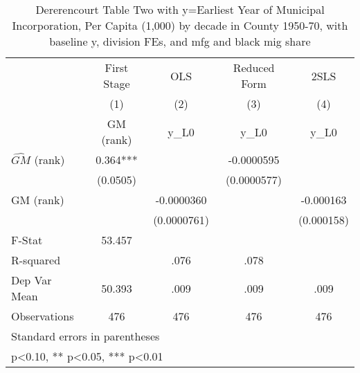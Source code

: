 \begin{table}[htbp]\centering
\def\sym#1{\ifmmode^{#1}\else\(^{#1}\)\fi}
\caption{Dererencourt Table Two with y=Earliest Year of Municipal Incorporation, Per Capita (1,000) by decade in County 1950-70, with baseline y, division FEs, and mfg and black mig share}
\begin{tabular}{l*{4}{c}}
\toprule
                    & First Stage   &         OLS   &Reduced Form   &        2SLS   \\
                    &\multicolumn{1}{c}{(1)}&\multicolumn{1}{c}{(2)}&\multicolumn{1}{c}{(3)}&\multicolumn{1}{c}{(4)}\\
                    &\multicolumn{1}{c}{GM  (rank)}&\multicolumn{1}{c}{y\_L0}&\multicolumn{1}{c}{y\_L0}&\multicolumn{1}{c}{y\_L0}\\
\midrule
$\hat{GM}$ (rank)   &       0.364***&               &  -0.0000595   &               \\
                    &    (0.0505)   &               & (0.0000577)   &               \\
\addlinespace
GM  (rank)          &               &  -0.0000360   &               &   -0.000163   \\
                    &               & (0.0000761)   &               &  (0.000158)   \\
\midrule
F-Stat              &      53.457   &               &               &               \\
R-squared           &               &        .076   &        .078   &               \\
Dep Var Mean        &      50.393   &        .009   &        .009   &        .009   \\
Observations        &         476   &         476   &         476   &         476   \\
\bottomrule
\multicolumn{5}{l}{\footnotesize Standard errors in parentheses}\\
\multicolumn{5}{l}{\footnotesize * p<0.10, ** p<0.05, *** p<0.01}\\
\end{tabular}
\end{table}
